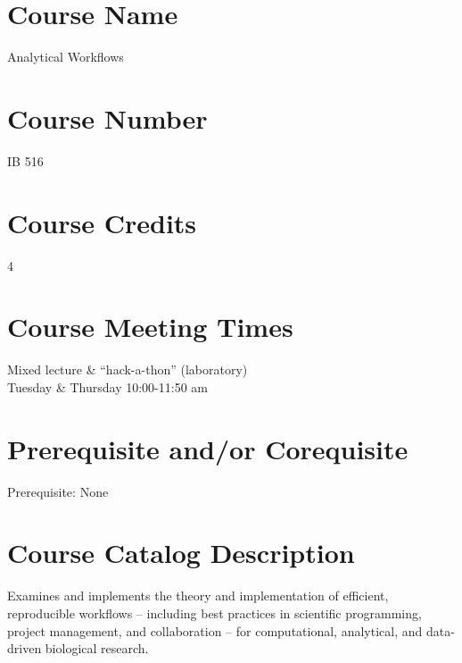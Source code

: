 \documentclass[10pt]{article}
\begin{document}



\section*{Course Name}
Analytical Workflows

\section*{Course Number}
 IB 516

\section*{Course Credits}
4

\section*{Course Meeting Times}
Mixed lecture \& ``hack-a-thon'' (laboratory)\\
Tuesday \& Thursday 10:00-11:50 am

\section*{Prerequisite and/or Corequisite}
Prerequisite: None

\section*{Course Catalog Description}
Examines and implements the theory and implementation of efficient, reproducible workflows -- 
including best practices in scientific programming, project management, and collaboration --  for 
computational, analytical, and data-driven biological research.
\end{document}
